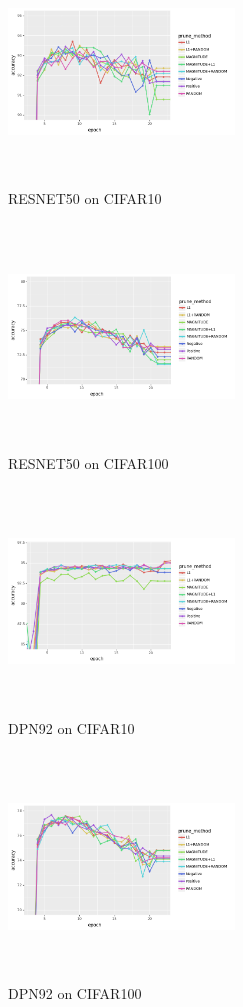 \documentclass[runningheads]{llncs}
\begin{document}
\begin{figure}[H]
\centering
\includegraphics[width=6cm, height=6cm]{Paper/images/resnet50cifar10.png}
\caption{RESNET50 on CIFAR10}
\end{figure}
\begin{figure}[H]
\centering
\includegraphics[width=6cm, height=6cm]{Paper/images/resnet50cifar100.png}
\caption{RESNET50 on CIFAR100}
\end{figure}
\begin{figure}[H]
\centering
\includegraphics[width=6cm, height=6cm]{Paper/images/dpn92cifar10.png}
\caption{DPN92 on CIFAR10}
\end{figure}
\begin{figure}[H]
\centering
\includegraphics[width=6cm, height=6cm]{Paper/images/dpn92cifar100.png}
\caption{DPN92 on CIFAR100}
\end{figure}
\end{document}
